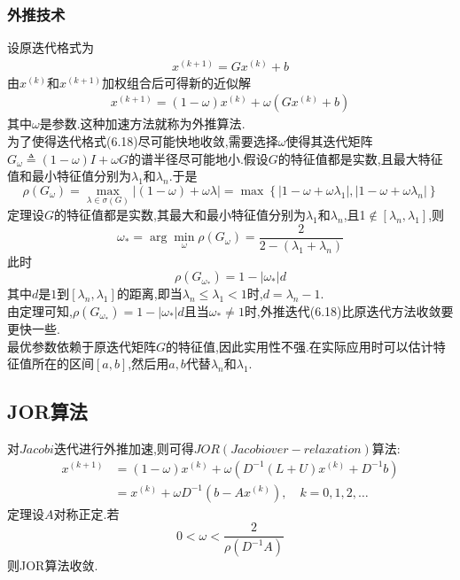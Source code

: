 \documentclass[12pt,a4paper]{article}
\begin{document}
\subsubsection{外推技术}
设原迭代格式为
\begin{align*}
x^{(k+1)}=G x^{(k)}+b
\tag{6.17}
\end{align*}
由$x^{(k)}$和$x^{(k+1)}$加权组合后可得新的近似解
\begin{align*}
x^{(k+1)}=(1-\omega) x^{(k)}+\omega\left(G x^{(k)}+b\right)
\tag{6.18}
\end{align*}
其中$\omega$是参数.这种加速方法就称为{\color{blue}外推算法}.\\
为了使得迭代格式(6.18)尽可能快地收敛,需要选择$\omega$使得其迭代矩阵$G_{\omega} \triangleq(1-\omega) I+\omega G$的谱半径尽可能地小.假设$G$的特征值都是实数,且最大特征值和最小特征值分别为$\lambda_{1}$和$\lambda_{n}$.于是
$$
\rho\left(G_{\omega}\right)=\max _{\lambda \in \sigma(G)}|(1-\omega)+\omega \lambda|=\max \left\{\left|1-\omega+\omega \lambda_{1}\right|,\left|1-\omega+\omega \lambda_{n}\right|\right\}
$$
{\color{blue}定理}\qquad 设$G$的特征值都是实数,其最大和最小特征值分别为$\lambda_{1}$和$\lambda_{n}$,且1$\notin\left[\lambda_{n}, \lambda_{1}\right]$,则
$$
\omega_{*}=\arg \min _{\omega} \rho\left(G_{\omega}\right)=\frac{2}{2-\left(\lambda_{1}+\lambda_{n}\right)}
$$
此时
$$
\rho\left(G_{\omega_{*}}\right)=1-\left|\omega_{*}\right| d
$$
其中$d$是$1$到$\left[\lambda_{n}, \lambda_{1}\right]$的距离,即当$\lambda_{n} \leq \lambda_{1}<1$时,$d=\lambda_{n}-1$.\\
由定理可知,$\rho\left(G_{\omega_{*}}\right)=1-\left|\omega_{*}\right| d$且当$\omega_{*} \neq 1$时,外推迭代(6.18)比原迭代方法收敛要更快一些.\\
最优参数依赖于原迭代矩阵$G$的特征值,因此实用性不强.在实际应用时可以估计特征值所在的区间$[a, b]$,然后用$a,b$代替$\lambda_{n}$和$\lambda_{1}$.
\subsection*{JOR算法}
对$Jacobi$迭代进行外推加速,则可得$JOR (Jacobi over-relaxation)$算法:
$$
\begin{aligned} x^{(k+1)} &=(1-\omega) x^{(k)}+\omega\left(D^{-1}(L+U) x^{(k)}+D^{-1} b\right) \\ &=x^{(k)}+\omega D^{-1}\left(b-A x^{(k)}\right), \quad k=0,1,2, \ldots \end{aligned}
$$
{\color{blue}定理}\qquad 设$A$对称正定.若
$$
0<\omega<\frac{2}{\rho\left(D^{-1} A\right)}
$$
则JOR算法收敛.\\
\end{document}
